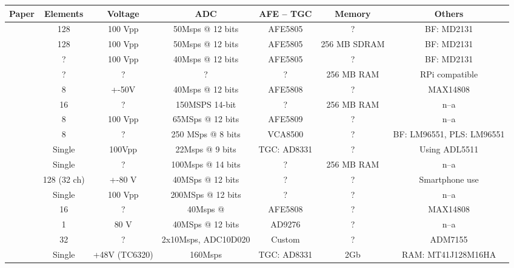 
\begin{table*}[t]
 \begin{tabular}{||c | c c c c c | c ||} 

 \hline
 Paper 			& Elements 	& Voltage 	& ADC 			& AFE -- TGC 	& Memory 	& Others\\ 
 \hline\hline	
 \cite{assef_design_2012}	& 128		& 100 Vpp 	& 50Msps @ 12 bits	& AFE5805	& ? 		& BF: MD2131 \\ 
 \hline
 \cite{assef_compact_2014}	& 128		& 100 Vpp  	& 50Msps @ 12 bits	& AFE5805	& 256 MB SDRAM  & BF: MD2131 \\ 
 \hline
 \cite{assef_flexible_2015}	& ? 		& 100 Vpp 	& 40Msps @ 12 bits 	& AFE5805	&  ?		& BF: MD2131 \\ 
 \hline
 \cite{bharath_portable_2015}	& ?	 	& ?	 	& ?			& ?		& 256 MB RAM	& RPi compatible\\ 
 \hline
 \cite{bharath_novel_2016}	& 8	 	& +-50V	 	& 40Msps @ 12 bits	& AFE5808	& ? 		& MAX14808 \\ 
 \hline
 \cite{chatar_analysis_2016}	& 16	 	& ?	 	& 150MSPS 14-bit	& ?		& 256 MB RAM	& n--a \\ 
 \hline
 \cite{dusa_low_2014}		& 8 		& 100 Vpp 	& 65MSps @ 12 bits 	& AFE5809	& ? 		& n--a \\ 
 \hline
 \cite{govindan_reconfigurable_2015}	& 8	 & ?	 	& 250 MSps @ 8 bits	& VCA8500	& ? 		& BF: LM96551, PLS: LM96551\\ 
 \hline
 \cite{jonveaux_arduino-like_2017}	& Single & 100Vpp 	& 22Msps @ 9 bits	& TGC: AD8331	& ? 		& Using ADL5511 \\ 
 \hline
 \cite{kushi_ultrasonic_2017}	& Single	& ?		& 100Msps @ 14 bits 	& ?		& 256 MB RAM	& n--a \\
 \hline
 \cite{kim_smart-phone_2017}	& 128 (32 ch)	& +-80 V 	& 40MSps @ 12 bits 	& ?		& ? 		& Smartphone use\\ 
 \hline
 \cite{kruizinga_compressive_2017} & Single 	& 100 Vpp 	& 200MSps @ 12 bits 	& ?		& ?		& n--a \\
 \hline
 \cite{lee_new_2014}		& 16 		& ?		& 40Msps @		& AFE5808	& ? 		& MAX14808\\ 
 \hline
 \cite{li_new_2014}		& 1	 	& 80 V	 	& 40MSps @ 12 bits 	& AD9276	& ?		& n--a \\
 \hline
 \cite{peyton_comparison_2018	& 32}	 	& ?	 	& 2x10Msps, ADC10D020	& Custom	& ? 		& ADM7155\\ 
 \hline
 \cite{qiu_delayed-excitation_2018} 	& Single  & +48V (TC6320) & 160Msps		& TGC: AD8331	& 2Gb		& RAM: MT41J128M16HA \\ 

\end{tabular}
\end{table*}
